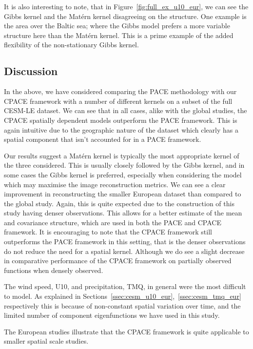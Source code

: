 It is also interesting to note, that in Figure~\ref{fig:full_ex_u10_eur}, we can see the Gibbs kernel and the Mat\'ern kernel disagreeing on the structure.
One example is the area over the Baltic sea;  where the Gibbs model prefers a more variable structure here than the Mat\'ern kernel.
This is a prime example of the added flexibility of the non-stationary Gibbs kernel. 

\subsection{Discussion \label{ssec:cesm_dis_eur}}
In the above, we have considered comparing the PACE methodology with our CPACE framework with a number of different kernels on a subset of the full CESM-LE dataset.
We can see that in all cases, alike with the global studies, the CPACE spatially dependent models outperform the PACE framework.
This is again intuitive due to the geographic nature of the dataset which clearly has a spatial component that isn't accounted for in a PACE framework.

Our results suggest a Mat\'ern kernel is typically the most appropriate kernel of the three considered.
This is usually closely followed by the Gibbs kernel, and in some cases the Gibbs kernel is preferred, especially when considering the model which may maximise the image reconstruction metrics.
We can see a clear improvement in reconstructing the smaller European dataset than compared to the global study.
Again, this is quite expected due to the construction of this study having denser observations.
This allows for a better estimate of the  mean and covariance structure, which are used in both the PACE and CPACE framework.
It is encouraging to note that the CPACE framework still outperforms the PACE framework in this setting, that is the denser observations do not reduce the need for a spatial kernel.
Although we do see a slight decrease in comparative performance of the CPACE framework on partially observed functions when densely observed.

The wind speed, U10, and precipitation, TMQ, in general were the most difficult to model.
As explained in Sections~\ref{ssec:cesm_u10_eur},~\ref{ssec:cesm_tmq_eur} respectively this is because of non-constant spatial variation over time, and the limited number of component eigenfunctions we have used in this study.

The European studies illustrate that the CPACE framework is quite applicable to smaller spatial scale studies.


